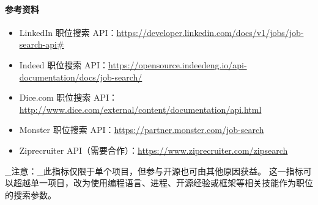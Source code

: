 \hypertarget{ux53c2ux8003ux8d44ux6599}{%
\paragraph{参考资料}\label{ux53c2ux8003ux8d44ux6599}}

\begin{itemize}
\tightlist
\item
  LinkedIn 职位搜索
  API：\href{https://developer.linkedin.com/docs/v1/jobs/job-search-api\#}{https://developer.linkedin.com/docs/v1/jobs/job-search-api\#}
\item
  Indeed 职位搜索
  API：\href{https://opensource.indeedeng.io/api-documentation/docs/job-search/}{https://opensource.indeedeng.io/api-documentation/docs/job-search/}
\item
  Dice.com 职位搜索
  API：\href{http://www.dice.com/external/content/documentation/api.html}{http://www.dice.com/external/content/documentation/api.html}
\item
  Monster 职位搜索
  API：\href{https://partner.monster.com/job-search}{https://partner.monster.com/job-search}
\item
  Ziprecruiter
  API（需要合作）：\href{https://www.ziprecruiter.com/zipsearch}{https://www.ziprecruiter.com/zipsearch}
\end{itemize}

\_注意：\_此指标仅限于单个项目，但参与开源也可由其他原因获益。
这一指标可以超越单一项目，改为使用编程语言、进程、开源经验或框架等相关技能作为职位的搜索参数。
